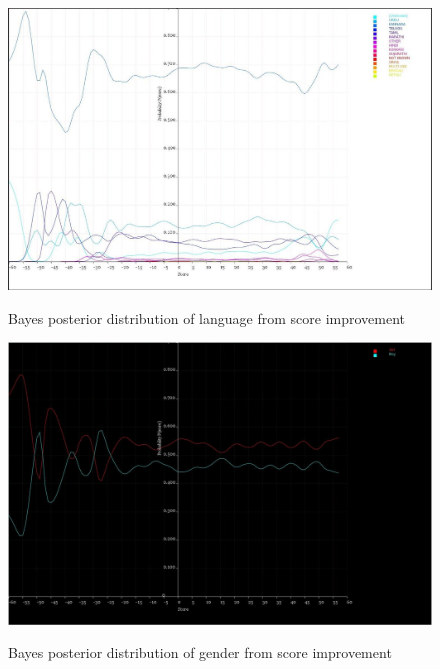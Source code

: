 \documentclass[10pt]{article}
\begin{document}
\begin{figure}
\caption{Bayes posterior distribution of language from score improvement}
\label{BayesLanguageFromImprovement}
\begin{center}
\includegraphics[width=160mm]{ReportMedia/BayesLanguageFromImprovement.jpg}\\
\end{center}
\end{figure}
\begin{figure}
\caption{Bayes posterior distribution of gender from score improvement}
\label{BayesGenderFromImprovement}
\begin{center}
\includegraphics[width=160mm]{ReportMedia/BayesGenderFromImprovement.jpg}\\
\end{center}
\end{figure}
\end{document}
